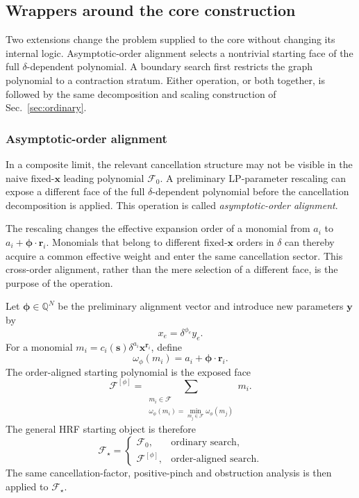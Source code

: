 \documentclass[a4paper,11pt]{article}
\newcommand{\x}{\boldsymbol{x}}
\newcommand{\s}{\boldsymbol{s}}
\begin{document}
\subsection{Wrappers around the core construction}
\label{sec:alignment}

Two extensions change the problem supplied to the core without changing its
internal logic.  Asymptotic-order alignment selects a nontrivial starting
face of the full \(\delta\)-dependent polynomial.  A boundary search first
restricts the graph polynomial to a contraction stratum.  Either operation,
or both together, is followed by the same decomposition and scaling
construction of Sec.~\ref{sec:ordinary}.

\subsubsection{Asymptotic-order alignment}

In a composite limit, the relevant cancellation structure may not be visible
in the naive fixed-\(\x\) leading polynomial \(\mathcal F_0\).  A preliminary
LP-parameter rescaling can expose a different face of the full
\(\delta\)-dependent polynomial before the cancellation decomposition is
applied.  This operation is called \emph{asymptotic-order alignment}.

The rescaling changes the effective expansion order of a monomial from
\(a_i\) to \(a_i+\boldsymbol\phi\cdot\boldsymbol r_i\).  Monomials that
belong to different fixed-\(\x\) orders in \(\delta\) can thereby acquire a
common effective weight and enter the same cancellation sector.  This
cross-order alignment, rather than the mere selection of a different face,
is the purpose of the operation.

Let \(\boldsymbol\phi\in\mathbb Q^N\) be the preliminary alignment vector and
introduce new parameters \(\boldsymbol y\) by
\begin{equation}
 x_e=\delta^{\phi_e}y_e.
 \label{eq:first-alignment-map}
\end{equation}
For a monomial
\(m_i=c_i(\s)\delta^{a_i}\x^{\boldsymbol r_i}\), define
\begin{equation}
 \omega_{\phi}(m_i)
 =
 a_i+\boldsymbol\phi\cdot\boldsymbol r_i.
 \label{eq:alignment-weight}
\end{equation}
The order-aligned starting polynomial is the exposed face
\begin{equation}
 \mathcal F^{[\phi]}
 =
 \sum_{\substack{m_i\in\mathcal F\\
                  \omega_\phi(m_i)=
                  \min_{m_j\in\mathcal F}\omega_\phi(m_j)}}m_i.
\label{eq:alignmentface}
\end{equation}
The general HRF starting object is therefore
\begin{equation}
 \mathcal F_\star=
 \begin{cases}
   \mathcal F_0, & \text{ordinary search},\\
   \mathcal F^{[\phi]}, & \text{order-aligned search}.
 \end{cases}
\label{eq:Fstar}
\end{equation}
The same cancellation-factor, positive-pinch and obstruction analysis is
then applied to \(\mathcal F_\star\).
\end{document}
